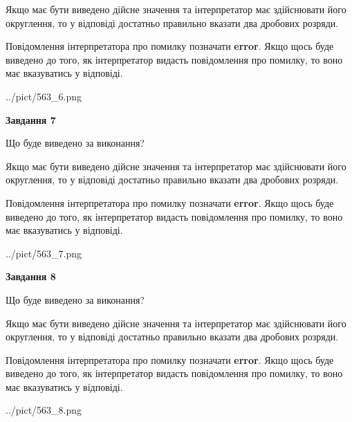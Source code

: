 \documentclass[12pt, ukrainian]{article}
\begin{document}
{\begin {Large}
Якщо має бути виведено дійсне значення та інтерпретатор має здійснювати його округлення, 
то у відповіді достатньо правильно вказати два дробових розряди.

Повідомлення інтерпретатора про помилку позначати \textbf{error}.
Якщо щось буде виведено до того, як інтерпретатор видасть повідомлення про помилку, 
то воно має вказуватись у відповіді. \par

\begin{center}
	{../pict/563_6.png}
\end{center}
\newpage

{\begin {center}\textbf{Завдання 7}\end {center}}\par
Що буде виведено за виконання? \par

Якщо має бути виведено дійсне значення та інтерпретатор має здійснювати його округлення, 
то у відповіді достатньо правильно вказати два дробових розряди.

Повідомлення інтерпретатора про помилку позначати \textbf{error}.
Якщо щось буде виведено до того, як інтерпретатор видасть повідомлення про помилку, 
то воно має вказуватись у відповіді. \par

\begin{center}
	{../pict/563_7.png}
\end{center}
\newpage

{\begin {center}\textbf{Завдання 8}\end {center}}\par
Що буде виведено за виконання? \par

Якщо має бути виведено дійсне значення та інтерпретатор має здійснювати його округлення, 
то у відповіді достатньо правильно вказати два дробових розряди.

Повідомлення інтерпретатора про помилку позначати \textbf{error}.
Якщо щось буде виведено до того, як інтерпретатор видасть повідомлення про помилку, 
то воно має вказуватись у відповіді. \par

\begin{center}
	{../pict/563_8.png}
\end{center}
\newpage


\end{Large}}
\end{document}
